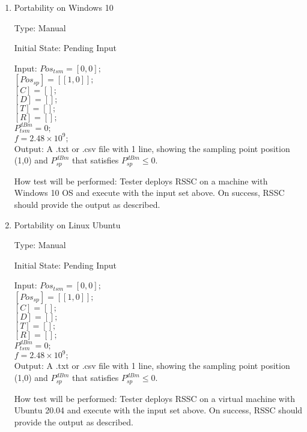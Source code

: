 \documentclass[12pt, titlepage]{article}
\begin{document}
\begin{enumerate}

\item{Portability on Windows 10\\}

Type: Manual
					
Initial State: Pending Input
					
Input: $Pos_{tsm} = [0,0];$\\
$[Pos_{sp}] = [[1,0]];$\\
$[C] = [ ];$\\
$[D] = [ ];$\\
$[T] = [ ];$\\
$[R] = [ ];$\\
$P_{tsm}^{dBm} = 0;$\\
$f = 2.48\times10^{9};$\\
					
Output: A .txt or .csv file with 1 line, showing the sampling point
position (1,0) and $P_{sp}^{dBm}$ that satisfies $P_{sp}^{dBm} 
\leq 0$. 
					
How test will be performed: Tester deploys RSSC on a machine with Windows 
10 OS and execute with the input set above. On success, RSSC should
provide the output as described.


\item{Portability on Linux Ubuntu\\}

Type: Manual
					
Initial State: Pending Input
					
Input: $Pos_{tsm} = [0,0];$\\
$[Pos_{sp}] = [[1,0]];$\\
$[C] = [ ];$\\
$[D] = [ ];$\\
$[T] = [ ];$\\
$[R] = [ ];$\\
$P_{tsm}^{dBm} = 0;$\\
$f = 2.48\times10^{9};$\\
					
Output: A .txt or .csv file with 1 line, showing the sampling point
position (1,0) and $P_{sp}^{dBm}$ that satisfies $P_{sp}^{dBm} 
\leq 0$. 
					
How test will be performed: Tester deploys RSSC on a virtual machine 
with Ubuntu 20.04 and execute with the input set above. On success, 
RSSC should provide the output as described.

\end{enumerate}
\end{document}
